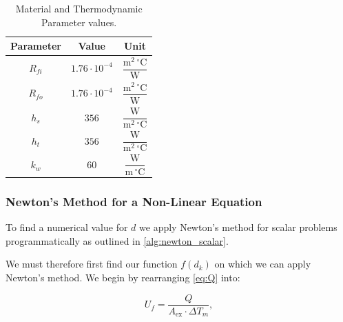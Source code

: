 \documentclass[11pt, a4paper]{article}
\theoremstyle{definition}
\begin{document}
\begin{table}[H]
  \centering
  \begin{tabular}{@{}ccc@{}}
    \toprule
    Parameter & Value & Unit \\
    \midrule
    $R_{fi}$ & $1.76 \cdot 10^{-4}$ & $\dfrac{\mathrm{m}^2\,{^\circ}\mathrm{C}}{\mathrm{W}}$ \\[10pt]
    $R_{fo}$ & $1.76 \cdot 10^{-4}$ & $\dfrac{\mathrm{m}^2\,{^\circ}\mathrm{C}}{\mathrm{W}}$ \\[10pt]
    $h_s$    & $356$                 & $\dfrac{\mathrm{W}}{\mathrm{m}^2\,{^\circ}\mathrm{C}}$ \\[10pt]
    $h_t$    & $356$                 & $\dfrac{\mathrm{W}}{\mathrm{m}^2\,{^\circ}\mathrm{C}}$ \\[10pt]
    $k_w$    & $60$                  & $\dfrac{\mathrm{W}}{\mathrm{m}\,{^\circ}\mathrm{C}}$   \\[6pt]
    \bottomrule
  \end{tabular}
  \caption{Material and Thermodynamic Parameter values.}
  \label{tab:params1}
\end{table}

\subsubsection{Newton's Method for a Non-Linear Equation}

To find a numerical value for $d$ we apply Newton's method for scalar problems
programmatically as outlined in \cref{alg:newton_scalar}.

\begin{algorithm}[H]
  \caption{Newton's method -- scalar equation}
  \label{alg:newton_scalar}
  \begin{algorithmic}
    \ENDWHILE
  \end{algorithmic}
\end{algorithm}

We must therefore first find our function $f(d_k)$ on which we can apply Newton's method.
We begin by rearranging \cref{eq:Q} into:

\begin{equation}
    U_f = \frac{Q}{A_{\mathrm{ex}}\cdot \Delta T_m},
    \label{eq:U_f2}
\end{equation}
\end{document}
